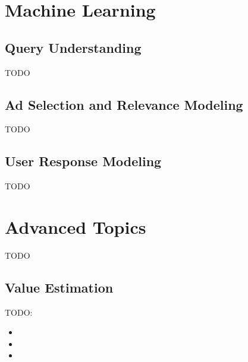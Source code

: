 \documentclass[prodmode,acmtist]{acmsmall} %
\begin{document}


\section{Machine Learning} %
\label{sec:machine_learning}

\subsection{Query Understanding} %
\label{sub:query_understanding}

TODO



\subsection{Ad Selection and Relevance Modeling} %
\label{sub:ad_selection_and_relevance_modeling}

TODO


\subsection{User Response Modeling} %
\label{sub:user_response_modeling}

TODO


\section{Advanced Topics} %
\label{sec:advanced_topics}

TODO

\subsection{Value Estimation} %
\label{sub:value_estimation}

TODO:
\begin{itemize}
	\item {}
	\item {}
	\item {}
\end{itemize}	
\end{document}
